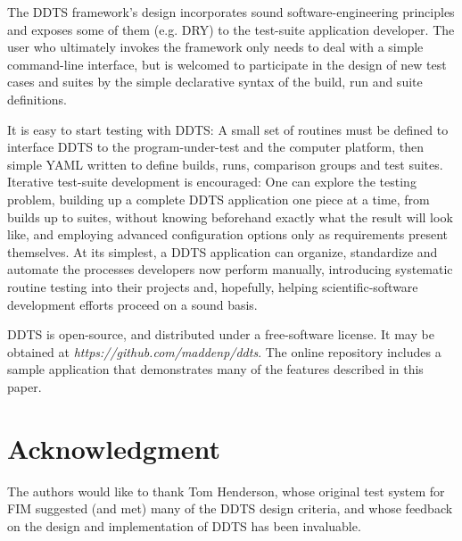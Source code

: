 \documentclass[conference]{IEEEtran}
\begin{document}
The DDTS framework's design incorporates sound software-engineering principles and exposes some of them (e.g. DRY) to the test-suite application developer. The user who ultimately invokes the framework only needs to deal with a simple command-line interface, but is welcomed to participate in the design of new test cases and suites by the simple declarative syntax of the build, run and suite definitions.

It is easy to start testing with DDTS: A small set of routines must be defined to interface DDTS to the program-under-test and the computer platform, then simple YAML written to define builds, runs, comparison groups and test suites. Iterative test-suite development is encouraged: One can explore the testing problem, building up a complete DDTS application one piece at a time, from builds up to suites, without knowing beforehand exactly what the result will look like, and employing advanced configuration options only as requirements present themselves. At its simplest, a DDTS application can organize, standardize and automate the processes developers now perform manually, introducing systematic routine testing into their projects and, hopefully, helping scientific-software development efforts proceed on a sound basis.

DDTS is open-source, and distributed under a free-software license. It may be obtained at \emph{https://github.com/maddenp/ddts}. The online repository includes a sample application that demonstrates many of the features described in this paper.

\section*{Acknowledgment}

The authors would like to thank Tom Henderson, whose original test system for FIM suggested (and met) many of the DDTS design criteria, and whose feedback on the design and implementation of DDTS has been invaluable.
\end{document}
